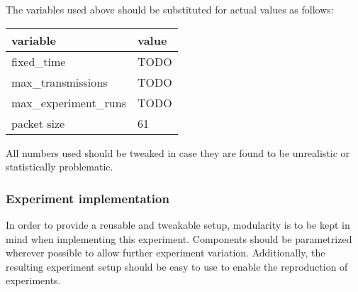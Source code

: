 \documentclass{acm_proc_article-sp}
\begin{document}
The variables used above should be substituted for actual values as follows:

\begin{tabularx}{\linewidth}{l | l}
  variable & value \\
  \hline
  fixed\_time & TODO \\
  max\_transmissions & TODO \\
  max\_experiment\_runs & TODO \\
  packet size & 61
\end{tabularx}

All numbers used should be tweaked in case they are found to be unrealistic or statistically problematic.


\subsubsection{Experiment implementation}
\label{subsec:implementation}
In order to provide a reusable and tweakable setup, modularity is to be kept in mind when implementing this experiment. Components should be parametrized wherever possible to allow further experiment variation. Additionally, the resulting experiment setup should be easy to use to enable the reproduction of experiments.
\end{document}
